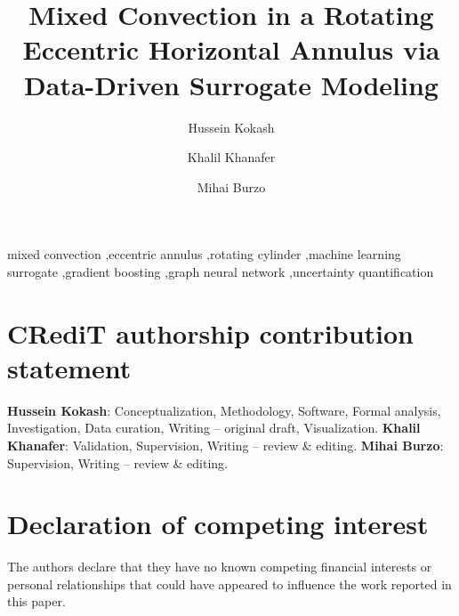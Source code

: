 \documentclass[preprint,12pt]{elsarticle}
\begin{document}
\begin{frontmatter}

\title{Mixed Convection in a Rotating Eccentric Horizontal Annulus via Data-Driven Surrogate Modeling}

\author[aum,umflint]{Hussein Kokash}
\author[umflint]{Khalil Khanafer}
\author[umflint,umaa]{Mihai Burzo}

\address[aum]{Department of Mechanical Engineering, American University of Madaba, Madaba, Jordan}
\address[umflint]{Department of Mechanical Engineering, College of Innovation \& Technology, University of Michigan-Flint, Flint, MI 48502, USA}
\address[umaa]{Department of Mechanical Engineering, University of Michigan, Ann Arbor, MI 48109, USA}

\begin{abstract}

\end{abstract}

\begin{keyword}
mixed convection \sep eccentric annulus \sep rotating cylinder \sep machine learning surrogate \sep gradient boosting \sep graph neural network \sep uncertainty quantification
\end{keyword}

\end{frontmatter}

\linenumbers









\clearpage



\section*{CRediT authorship contribution statement}
\textbf{Hussein Kokash}: Conceptualization, Methodology, Software, Formal analysis, Investigation, Data curation, Writing -- original draft, Visualization. \textbf{Khalil Khanafer}: Validation, Supervision, Writing -- review \& editing. \textbf{Mihai Burzo}: Supervision, Writing -- review \& editing.

\section*{Declaration of competing interest}
The authors declare that they have no known competing financial interests or personal relationships that could have appeared to influence the work reported in this paper.



\end{document}
